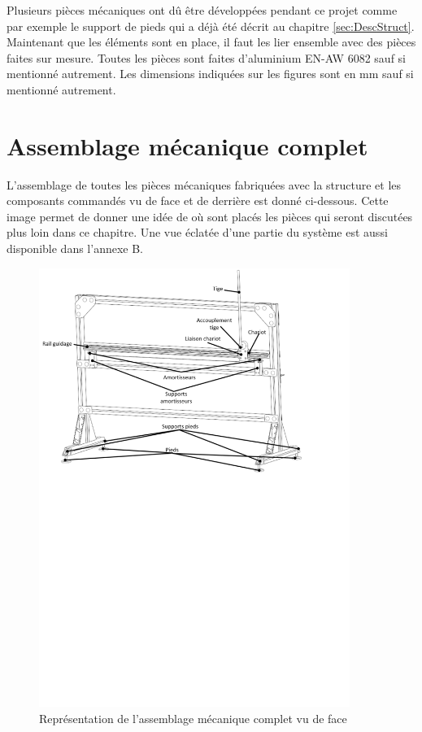 Plusieurs pièces mécaniques ont dû être développées pendant ce projet comme par exemple le support de pieds  qui a déjà été décrit au chapitre \ref{sec:DescStruct}.
Maintenant que les éléments sont en place, il faut les lier ensemble avec des pièces faites sur mesure. Toutes les pièces sont faites
d'aluminium EN-AW 6082 sauf si mentionné autrement. Les dimensions indiquées sur les figures sont en mm sauf si mentionné autrement.

\section{Assemblage mécanique complet}\label{sec:AssMecComp}
L'assemblage de toutes les pièces mécaniques fabriquées avec la structure et les composants commandés vu de face et de derrière est
donné ci-dessous. Cette image permet de donner une idée de où sont placés les pièces qui seront discutées plus loin dans ce chapitre. Une vue
éclatée d'une partie du système est aussi disponible dans l'annexe B.

\begin{figure}[H]
    \centering
    \includegraphics[width = 0.9\textwidth]{assets/figures/AssemblageCompletFace.svg}
    \caption{Représentation de l'assemblage mécanique complet vu de face}
    \label{fig:AssCompFace}
\end{figure}

